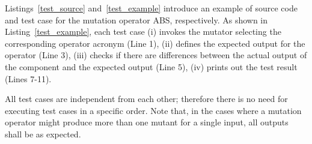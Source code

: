Listings~\ref{test_source} and~\ref{test_example} introduce an example of source code and test case for the mutation operator ABS, respectively. As shown in Listing~\ref{test_example}, each test case (i) invokes the mutator selecting the corresponding operator acronym (Line 1), (ii) defines the expected output for the operator (Line 3), (iii) checks if there are differences between the actual output of the component and the expected output (Line 5), (iv) prints out the test result (Lines 7-11).

All test cases are independent from each other; therefore there is no need for executing test cases in a specific order.
Note that, in the cases where a mutation operator might produce more than one mutant for a single input, all outputs shall be as expected.
